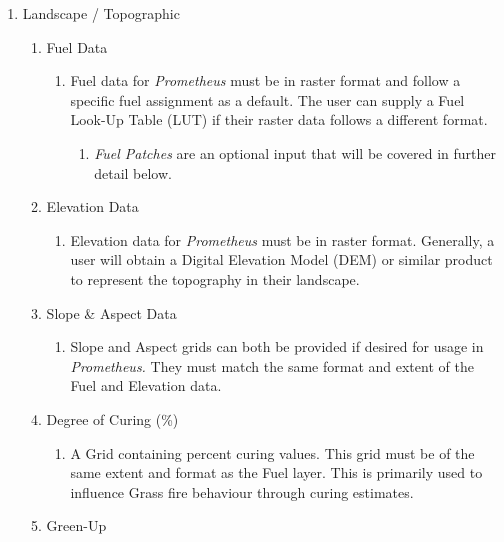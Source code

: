 \documentclass[
  letterpaper,
  DIV=11,
  numbers=noendperiod]{scrreprt}
\providecommand{\tightlist}{%
  \setlength{\itemsep}{0pt}\setlength{\parskip}{0pt}}
\begin{document}
\begin{enumerate}
\def\labelenumi{\arabic{enumi}.}
\tightlist
\item
  Landscape / Topographic

  \begin{enumerate}
  \def\labelenumii{\roman{enumii}.}
  \tightlist
  \item
    Fuel Data

    \begin{enumerate}
    \def\labelenumiii{\alph{enumiii}.}
    \tightlist
    \item
      Fuel data for \emph{Prometheus} must be in raster format and
      follow a specific fuel assignment as a default. The user can
      supply a Fuel Look-Up Table (LUT) if their raster data follows a
      different format.

      \begin{enumerate}
      \def\labelenumiv{\alph{enumiv}.}
      \setcounter{enumiv}{1}
      \tightlist
      \item
        \emph{Fuel Patches} are an optional input that will be covered
        in further detail below.
      \end{enumerate}
    \end{enumerate}
  \item
    Elevation Data

    \begin{enumerate}
    \def\labelenumiii{\alph{enumiii}.}
    \tightlist
    \item
      Elevation data for \emph{Prometheus} must be in raster format.
      Generally, a user will obtain a Digital Elevation Model (DEM) or
      similar product to represent the topography in their landscape.
    \end{enumerate}
  \item
    Slope \& Aspect Data

    \begin{enumerate}
    \def\labelenumiii{\roman{enumiii}.}
    \tightlist
    \item
      Slope and Aspect grids can both be provided if desired for usage
      in \emph{Prometheus.} They must match the same format and extent
      of the Fuel and Elevation data.
    \end{enumerate}
  \item
    Degree of Curing (\%)

    \begin{enumerate}
    \def\labelenumiii{\roman{enumiii}.}
    \tightlist
    \item
      A Grid containing percent curing values. This grid must be of the
      same extent and format as the Fuel layer. This is primarily used
      to influence Grass fire behaviour through curing estimates.
    \end{enumerate}
  \item
    Green-Up


\end{enumerate}
\end{enumerate}
\end{document}
